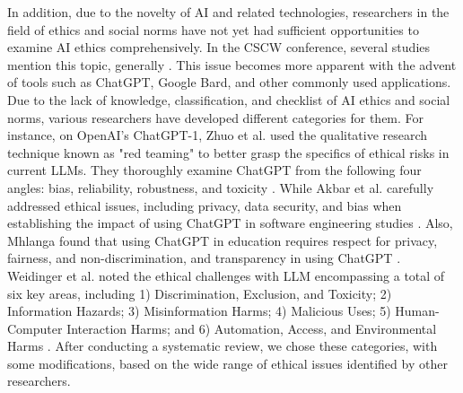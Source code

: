 \documentclass[sigconf]{acmart}
\begin{document}
In addition, due to the novelty of AI and related technologies, researchers in the field of ethics and social norms have not yet had sufficient opportunities to examine AI ethics comprehensively. In the CSCW conference, several studies mention this topic, generally \cite{10.1145/3311957.3359437, 10.1145/3301019.3320000, 10.1145/3406865.3418590}. This issue becomes more apparent with the advent of tools such as ChatGPT, Google Bard, and other commonly used applications. Due to the lack of knowledge, classification, and checklist of AI ethics and social norms, various researchers have developed different categories for them. For instance, on OpenAI's ChatGPT-1, Zhuo et al. used the qualitative research technique known as "red teaming" to better grasp the specifics of ethical risks in current LLMs. They thoroughly examine ChatGPT from the following four angles: bias, reliability, robustness, and toxicity \cite{Zhuo2023Exploring}. While Akbar et al. carefully addressed ethical issues, including privacy, data security, and bias when establishing the impact of using ChatGPT in software engineering studies \cite{akbar2023ethical}. Also, Mhlanga found that using ChatGPT in education requires respect for privacy, fairness, and non-discrimination, and transparency in using ChatGPT \cite{mhlanga2023open}. Weidinger et al. noted the ethical challenges with LLM encompassing a total of six key areas, including 1) Discrimination, Exclusion, and Toxicity; 2) Information Hazards; 3) Misinformation Harms; 4) Malicious Uses; 5) Human-Computer Interaction Harms; and 6) Automation, Access, and Environmental Harms \cite{weidinger2021ethical}. After conducting a systematic review, we chose these categories, with some modifications, based on the wide range of ethical issues identified by other researchers.
\end{document}
